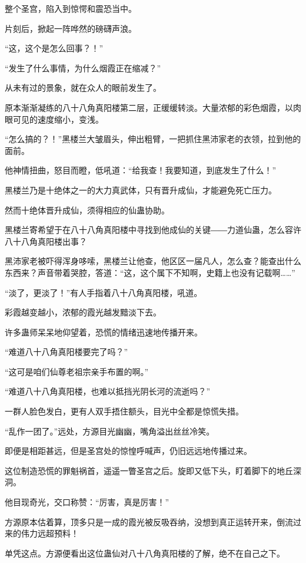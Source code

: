 
\begin{this_body}

整个圣宫，陷入到惊愕和震恐当中。

片刻后，掀起一阵哗然的磅礴声浪。

“这，这个是怎么回事？！”

“发生了什么事情，为什么烟霞正在缩减？”

从未有过的景象，就在众人的眼前发生了。

原本渐渐凝练的八十八角真阳楼第二层，正缓缓转淡。大量浓郁的彩色烟霞，以肉眼可见的速度缩小，变浅。

“怎么搞的？！”黑楼兰大皱眉头，伸出粗臂，一把抓住黑沛家老的衣领，拉到他的面前。

他神情扭曲，怒目而瞪，低吼道：“给我查！我要知道，到底发生了什么！”

黑楼兰乃是十绝体之一的大力真武体，只有晋升成仙，才能避免死亡压力。

然而十绝体晋升成仙，须得相应的仙蛊协助。

黑楼兰寄希望于在八十八角真阳楼中寻找到他成仙的关键――力道仙蛊，怎么容许八十八角真阳楼出事？

黑沛家老被吓得浑身哆嗦，黑楼兰让他查，他区区一届凡人，怎么查？能查出什么东西来？声音带着哭腔，答道：“这，这个属下不知啊，史籍上也没有记载啊……”

“淡了，更淡了！”有人手指着八十八角真阳楼，吼道。

彩霞越变越小，浓郁的霞光越发黯淡下去。

许多蛊师呆呆地仰望着，恐慌的情绪迅速地传播开来。

“难道八十八角真阳楼要完了吗？”

“这可是咱们仙尊老祖宗亲手布置的啊。”

“难道八十八角真阳楼，也难以抵挡光阴长河的流逝吗？”

一群人脸色发白，更有人双手捂住额头，目光中全都是惊慌失措。

“乱作一团了。”远处，方源目光幽幽，嘴角溢出丝丝冷笑。

即便是相距甚远，但是圣宫处的惊惶呼喊声，仍旧远远地传播过来。

这位制造恐慌的罪魁祸首，遥遥一瞥圣宫之后。旋即又低下头，盯着脚下的地丘深洞。

他目现奇光，交口称赞：“厉害，真是厉害！”

方源原本估着算，顶多只是一成的霞光被反吸吞纳，没想到真正运转开来，倒流过来的伟力远超预料！

单凭这点。方源便看出这位蛊仙对八十八角真阳楼的了解，绝不在自己之下。


\end{this_body}
